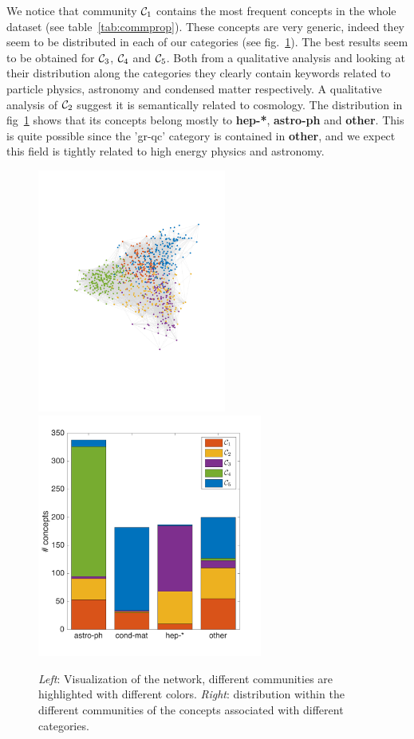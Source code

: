 \documentclass[a4paper,12pt,twoside]{article}
\def \bf {\textbf}
\def \comm {{{\cal C}}}
\begin{document}
We notice that community $\comm_1$ contains the most frequent concepts in the whole dataset (see table~\ref{tab:commprop}).
These concepts are very generic, indeed they seem to be distributed in each of our categories (see fig.~\ref{fig:comm}).
The best results seem to be obtained for $\comm_3$, $\comm_4$ and $\comm_5$.
 Both from a qualitative analysis and looking at their distribution along the categories they clearly contain keywords related to particle physics, astronomy and condensed matter respectively.
A qualitative analysis of $\comm_2$ suggest it is semantically related to cosmology. 
The distribution in fig~\ref{fig:comm} shows that its concepts belong mostly to \bf{hep-*}, \bf{astro-ph} and \bf{other}. 
This is quite possible since the 'gr-qc' category is contained in \bf{other}, and we expect this field is tightly related to high energy physics and astronomy.
\begin{figure}
  \centerline{
   \includegraphics[height=8cm,width=\textwidth,keepaspectratio]{../img/communities_graph.pdf}
   \includegraphics[height=8cm,width=\textwidth,keepaspectratio]{../img/categories_communities.pdf}
  }
  \caption{{\em Left}: Visualization of the network, different communities are highlighted with different colors. {\em Right}: distribution within the different communities of the concepts associated with different categories.}
  \label{fig:comm}
\end{figure}
\end{document}
